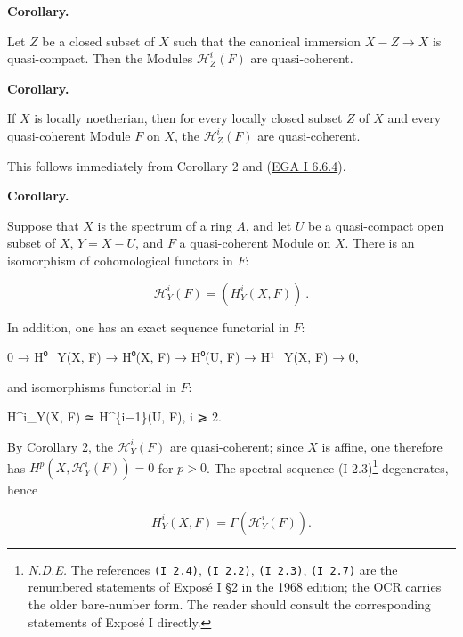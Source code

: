 \documentclass[
  11pt,
  a4paper,
]{book}
\newenvironment{Shaded}{}{}
\newcommand{\NormalTok}[1]{#1}
\begin{document}
\textbf{Corollary.}

Let \(Z\) be a closed subset of \(X\) such that the canonical immersion
\(X - Z \to X\) is quasi-compact. Then the Modules
\(\mathcal{H}^{i}_{Z}(F)\) are quasi-coherent.

\textbf{Corollary.}

If \(X\) is locally noetherian, then for every locally closed subset
\(Z\) of \(X\) and every quasi-coherent Module \(F\) on \(X\), the
\(\mathcal{H}^{i}_{Z}(F)\) are quasi-coherent.

This follows immediately from Corollary 2 and
(\href{https://jcreinhold.github.io/ega/i/01-06-finiteness-conditions.html\#66-quasi-compact-morphisms}{EGA
I 6.6.4}).

\textbf{Corollary.}

Suppose that \(X\) is the spectrum of a ring \(A\), and let \(U\) be a
quasi-compact open subset of \(X\), \(Y = X - U\), and \(F\) a
quasi-coherent Module on \(X\). There is an isomorphism of cohomological
functors in \(F\):

\[ \mathcal{H}^{i}_{Y}(F) = (H^{i}_{Y}(X, F))~. \]

In addition, one has an exact sequence functorial in \(F\):

\begin{Shaded}
\begin{Highlighting}[]
\NormalTok{0 → H⁰\_Y(X, F) → H⁰(X, F) → H⁰(U, F) → H¹\_Y(X, F) → 0,}
\end{Highlighting}
\end{Shaded}

and isomorphisms functorial in \(F\):

\begin{Shaded}
\begin{Highlighting}[]
\NormalTok{H\^{}i\_Y(X, F) ≃ H\^{}\{i−1\}(U, F),    i ⩾ 2.}
\end{Highlighting}
\end{Shaded}

By Corollary 2, the \(\mathcal{H}^{i}_{Y}(F)\) are quasi-coherent; since
\(X\) is affine, one therefore has \(H^{p}(X,
\mathcal{H}^{i}_{Y}(F)) = 0\) for \(p > 0\). The spectral sequence (I
2.3)\footnote{\emph{N.D.E.} The references \texttt{(I\ 2.4)},
  \texttt{(I\ 2.2)}, \texttt{(I\ 2.3)}, \texttt{(I\ 2.7)} are the
  renumbered statements of Exposé I §2 in the 1968 edition; the OCR
  carries the older bare-number form. The reader should consult the
  corresponding statements of Exposé I directly.} degenerates, hence

\[ H^{i}_{Y}(X, F) = \Gamma(\mathcal{H}^{i}_{Y}(F)). \]
\end{document}
